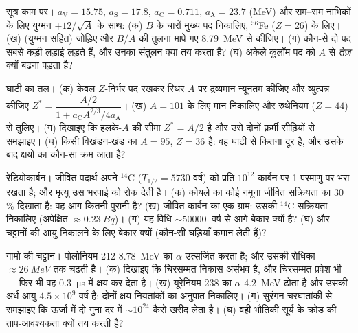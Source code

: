 \begin{exercise}[$\star\star$]\label{exo:b3:nuclear-physics:5}
सूत्र काम पर। $a_{\text{V}} = 15.75$,
$a_{\text{S}} = 17.8$, $a_{\text{C}} = 0.711$,
$a_{\text{A}} = 23.7$ (\unit{MeV}) और सम--सम नाभिकों के लिए युग्मन
$+12/\sqrt A$ के साथ: (क) $B$ के चारों मुख्य पद निकालिए,
$^{56}$Fe ($Z = 26$) के लिए। (ख) (युग्मन सहित) जोड़िए और
$B/A$ की तुलना मापे गए \qty{8.79}{MeV} से कीजिए। (ग) कौन-से दो
पद सबसे कड़ी लड़ाई लड़ते हैं, और उनका संतुलन क्या तय करता है? (घ)
अकेले कूलॉम पद को $A$ से \emph{तेज़} क्यों बढ़ना पड़ता है?
\end{exercise}

\begin{exercise}[$\star\star$]\label{exo:b3:nuclear-physics:6}
घाटी का तल। (क) केवल $Z$-निर्भर पद रखकर स्थिर $A$ पर
द्रव्यमान न्यूनतम कीजिए और व्युत्पन्न कीजिए
$Z^* = \dfrac{A/2}{1 + a_{\text{C}}A^{2/3}/4a_{\text{A}}}$। (ख)
$A = 101$ के लिए मान निकालिए और रुथेनियम ($Z = 44$) से तुलिए।
(ग) दिखाइए कि हलके-$A$ की सीमा $Z^* = A/2$ है और उसे दोनों फ़र्मी
सीढ़ियों से समझाइए। (घ) किसी विखंडन-खंड का $A = 95$,
$Z = 36$ है: वह घाटी से कितना दूर है, और उसके बाद क्षयों का कौन-सा
क्रम आता है?
\end{exercise}

\begin{exercise}[$\star\star$]\label{exo:b3:nuclear-physics:7}
रेडियोकार्बन। जीवित पदार्थ अपने $^{14}$C
($T_{1/2} = 5730$ वर्ष) को प्रति $10^{12}$ कार्बन पर 1 परमाणु पर
भरा रखता है; और मृत्यु उस भरपाई को रोक देती है। (क) कोयले का कोई
नमूना जीवित सक्रियता का 30\,\% दिखाता है: वह आग कितनी पुरानी है? (ख)
जीवित कार्बन का एक ग्राम: उसकी $^{14}$C सक्रियता निकालिए
(अपेक्षित $\approx\qty{0.23}{Bq}$)। (ग) यह विधि
$\sim\qty{50000}{}$ वर्ष से आगे बेकार क्यों है? (घ) और चट्टानों की
आयु निकालने के लिए बेकार क्यों (कौन-सी घड़ियाँ कमान लेती हैं)?
\end{exercise}

\begin{exercise}[$\star\star$]\label{exo:b3:nuclear-physics:8}
गामो की चट्टान। पोलोनियम-212 \qty{8.78}{MeV} का $\alpha$ उत्सर्जित
करता है; और उसकी रोधिका $\approx\qty{26}{MeV}$ तक चढ़ती है। (क)
दिखाइए कि चिरसम्मत निकास असंभव है, और चिरसम्मत प्रवेश भी --- फिर भी
वह \qty{0.3}{\micro s} में क्षय कर देता है। (ख) यूरेनियम-238 का
$\alpha$ \qty{4.2}{MeV} ढोता है और उसकी अर्ध-आयु $4.5\times10^9$ वर्ष
है: दोनों क्षय-नियतांकों का अनुपात निकालिए। (ग)
सुरंगन-चरघातांकी से समझाइए कि ऊर्जा में दो गुना दर में
$\sim10^{24}$ कैसे खरीद लेता है। (घ) वही भौतिकी
सूर्य के क्रोड की ताप-आवश्यकता क्यों तय करती है?
\end{exercise}

